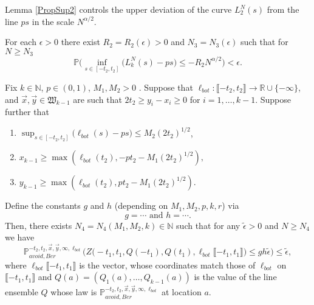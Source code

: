 Lemma \ref{PropSup2} controls the upper deviation of the curve $L^N_2(s)$ from the line $ps$ in the scale $N^{\alpha/2}$.
\begin{lemma}\label{PropSup2} For each $\epsilon > 0$ there exist $R_2=R_2( \epsilon) > 0$ and $N_3=N_3(\epsilon)$ such that for $N \geq N_3$
$$\mathbb{P}\Big( \inf_{s \in [ -t_2, t_2 ]}\big(L^N_k(s) - p s \big) \leq - R_2N^{\alpha/2} \Big) < \epsilon.$$
\end{lemma}

\begin{lemma}\label{LemmaAP1} Fix $k \in \mathbb{N}$, $p \in (0,1)$, $M_1, M_2 > 0$ . Suppose that $\ell_{bot}: \llbracket -t_2, t_2 \rrbracket \rightarrow \mathbb{R} \cup \{ - \infty \}$, and $\vec{x}, \vec{y} \in \mathfrak{W}_{k-1}$ are such that $2t_2 \geq y_i-x_i \geq 0$ for $i = 1, \dots, k-1$. Suppose further that
	\begin{enumerate}
		\item $\sup_{s \in [ -t_2,t_2]}\big(\ell_{bot}(s)  - ps \big)  \leq M_2 (2t_2)^{1/2}$,
		\item  $ x_{k-1} \geq \max\left(\ell_{bot}(t_2), -pt_2- M_1 (2t_2)^{1/2}\right),$
		\item $ y_{k-1} \geq  \max \left( \ell_{bot}(t_2),  p t_2- M_1(2t_2)^{1/2} \right).$
	\end{enumerate}
	Define the constants $g$ and $h$ (depending on $ M_1, M_2, p , k, r$) via
	$$g =  \cdots \mbox{ and } h = \cdots .$$
	Then, there exists $N_4 = N_4(M_1,M_2,k ) \in \mathbb{N}$  such that for any $\tilde{\epsilon}  > 0$ and $N \geq N_4$ we have
	\begin{equation}\label{eqn60}
	\mathbb{P}^{-t_2, t_2, \vec{x},\vec{y}, \infty, \ell_{bot} }_{avoid, Ber} \Big( Z\big(  -t_1, t_1, Q(-t_1) ,Q(t_1), \ell_{bot}\llbracket -t_1, t_1\rrbracket\big) \leq  gh \tilde{\epsilon}   \Big)  \leq \tilde{\epsilon},
	\end{equation}
	where $\ell_{bot}\llbracket -t_1, t_1\rrbracket$ is the vector, whose coordinates match those of $\ell_{bot}$ on $\llbracket -t_1, t_1\rrbracket$ and $Q(a) = (Q_1(a), \dots, Q_{k-1}(a))$ is the value of the line ensemble $Q$ whose law is $\mathbb{P}^{-t_2, t_2, \vec{x},\vec{y}, \infty, \ell_{bot} }_{avoid, Ber}$ at location $a$.
\end{lemma}


